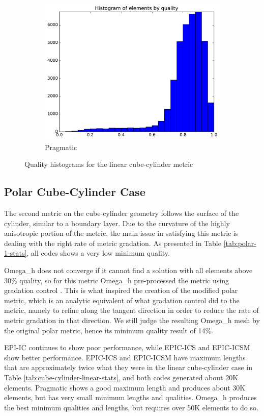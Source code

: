 \documentclass[3p,times,procedia,number]{elsarticle}
\begin{document}
\begin{figure}
\begin{subfigure}{.4\textwidth}
\includegraphics[width=\textwidth]{pragmatic-cube-cylinder-linear-quality.pdf}
\caption{Pragmatic}
\end{subfigure}
\caption{Quality histograms for the linear cube-cylinder metric}
\label{fig:cube-cylinder-linear-qualities}
\end{figure}

\subsection{Polar Cube-Cylinder Case}

The second metric on the cube-cylinder geometry follows the surface
of the cylinder, similar to a boundary layer.
Due to the curvature of the highly anisotropic portion of the metric,
the main issue in satisfying this metric is dealing with the
right rate of metric gradation.
As presented in Table \ref{tab:polar-1-stats}, all codes shows
a very low minimum quality.

Omega\_h does not converge if it cannot find a solution with
all elements above 30\% quality, so for this metric Omega\_h
pre-processed the metric using gradation control \cite{alauzet-fead-2010-size-gradation-aniso}.
This is what inspired the creation of the modified polar metric,
which is an analytic equivalent of what gradation control did
to the metric, namely to refine along the tangent direction
in order to reduce the rate of metric gradation in that direction.
We still judge the resulting Omega\_h mesh by the original polar
metric, hence its minimum quality result of 14\%.

EPI-IC continues to show poor performance, while EPIC-ICS
and EPIC-ICSM show better performance.
EPIC-ICS and EPIC-ICSM have maximum lengths that are approximately
twice what they were in the linear cube-cylinder case in
Table \ref{tab:cube-cylinder-linear-stats}, and both codes
generated about 20K elements.
Pragmatic shows a good maximum length and produces about 30K
elements, but has very small minimum lengths and qualities.
Omega\_h produces the best minimum qualities and lengths,
but requires over 50K elements to do so.
\end{document}
